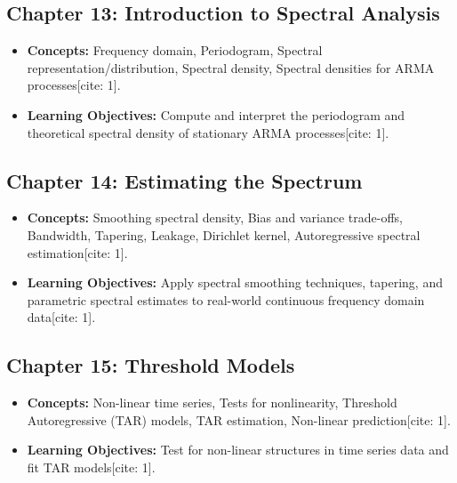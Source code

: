 \documentclass{article}
\begin{document}
\subsection*{Chapter 13: Introduction to Spectral Analysis}
\begin{itemize}
    \item \textbf{Concepts:} Frequency domain, Periodogram, Spectral representation/distribution, Spectral density, Spectral densities for ARMA processes[cite: 1].
    \item \textbf{Learning Objectives:} Compute and interpret the periodogram and theoretical spectral density of stationary ARMA processes[cite: 1].
\end{itemize}

\subsection*{Chapter 14: Estimating the Spectrum}
\begin{itemize}
    \item \textbf{Concepts:} Smoothing spectral density, Bias and variance trade-offs, Bandwidth, Tapering, Leakage, Dirichlet kernel, Autoregressive spectral estimation[cite: 1].
    \item \textbf{Learning Objectives:} Apply spectral smoothing techniques, tapering, and parametric spectral estimates to real-world continuous frequency domain data[cite: 1].
\end{itemize}

\subsection*{Chapter 15: Threshold Models}
\begin{itemize}
    \item \textbf{Concepts:} Non-linear time series, Tests for nonlinearity, Threshold Autoregressive (TAR) models, TAR estimation, Non-linear prediction[cite: 1].
    \item \textbf{Learning Objectives:} Test for non-linear structures in time series data and fit TAR models[cite: 1].
\end{itemize}
\end{document}
